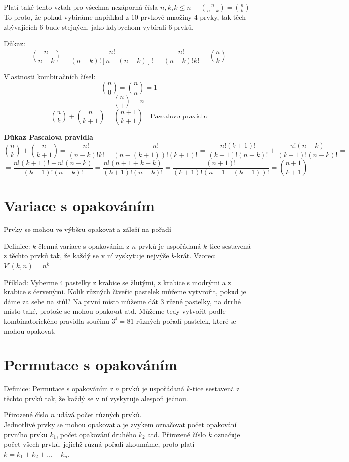 \documentclass[12pt]{article}
\begin{document}
Platí také tento vztah pro všechna nezáporná čísla $n, k, k\leq n\quad$ $\binom{n}{n-k} = \binom{n}{k}$ 
To proto, že pokud vybíráme například z $10$ prvkové množiny $4$ prvky, tak těch 
zbývajících $6$ bude stejných, jako kdybychom vybírali $6$ prvků.

Důkaz: \[\binom{n}{n-k} = \frac{n!}{(n-k)![n-(n-k)]!} = \frac{n!}{(n-k)!k!} = \binom{n}{k}\]

Vlastnosti kombinačních čísel:
\[\binom{n}{0} = \binom{n}{n} = 1\]
\[\binom{n}{1} = n\]
\[\binom{n}{k}+ \binom{n}{k+1} = \binom{n+1}{k+1} \quad \text{Pascalovo pravidlo}\]

\textbf{Důkaz Pascalova pravidla}
\[\binom{n}{k} + \binom{n}{k+1} = \frac{n!}{(n-k)!k!} + \frac{n!}{(n-(k+1))!(k+1)!} = \frac{n!(k+1)!}{(k+1)!(n-k)!} + \frac{n!(n-k)}{(k+1)!(n-k)!}=\]
\[=\frac{n!(k+1)! + n!(n-k)}{(k+1)!(n-k)!} = \frac{n!(n+1+k-k)}{(k+1)!(n-k)!} = \frac{(n+1)!}{(k+1)!(n+1-(k+1))!} = \binom{n+1}{k+1} \]

\section*{Variace s opakováním}
Prvky se mohou ve výběru opakovat a záleží na pořadí

Definice: $k$-členná variace s opakováním z $n$ prvků je uspořádaná $k$-tice sestavená z těchto prvků tak, že každý se v ní vyskytuje nejvýše $k$-krát.
Vzorec: $V'(k,n) = n^k$

Příklad: Vyberme 4 pastelky z krabice se žlutými, z krabice s modrými a z krabice s červenými. Kolik různých čtveřic pastelek můžeme vytvrořit, pokud je dáme za sebe na stůl? Na první místo můžeme dát 3 různé pastelky, na druhé místo také, protože se mohou opakovat atd.
Můžeme tedy vytvořit podle kombinatorického pravidla součinu $3^4 = 81$ různých pořadí pastelek, které se mohou opakovat.

\section*{Permutace s opakováním}
Definice: Permutace s opakováním z $n$ prvků je uspořádaná $k$-tice sestavená z těchto prvků tak, že každý se v ní vyskytuje alespoň jednou.

Přirozené číslo $n$ udává počet různých prvků.\\
Jednotlivé prvky se mohou opakovat a je zvykem označovat počet opakování prvního prvku $k_1$, počet opakování druhého $k_2$ atd. Přirozené číslo $k$ označuje počet všech prvků, jejichž různá pořadí zkoumáme, proto platí $k = k_1 + k_2 + \dots + k_n$.
\end{document}
